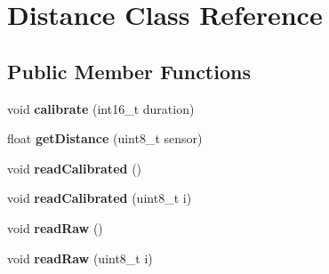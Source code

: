 \hypertarget{class_distance}{}\section{Distance Class Reference}
\label{class_distance}
\subsection*{Public Member Functions}
\begin{DoxyCompactItemize}
\item 
\mbox{\label{class_distance_a2690bae35cc62eca885908f3e66bf223}} 
void {\bfseries calibrate} (int16\+\_\+t duration)
\item 
\mbox{\label{class_distance_a95ceac083560337294bae7f3af74ce11}} 
float {\bfseries get\+Distance} (uint8\+\_\+t sensor)
\item 
\mbox{\label{class_distance_ab551cbc104a827328d82eab4b75df282}} 
void {\bfseries read\+Calibrated} ()
\item 
\mbox{\label{class_distance_aee6d12acb22f7e63088c69ccaafd0ffe}} 
void {\bfseries read\+Calibrated} (uint8\+\_\+t i)
\item 
\mbox{\label{class_distance_abae4e3129dbae11894dd5989278a2f46}} 
void {\bfseries read\+Raw} ()
\item 
\mbox{\label{class_distance_a3fd2a750002215e47abcf426c90f1bab}} 
void {\bfseries read\+Raw} (uint8\+\_\+t i)
\end{DoxyCompactItemize}
